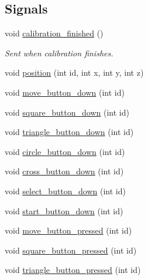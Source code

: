 \subsection*{Signals}
\begin{DoxyCompactItemize}
\item 
\hypertarget{class_p_s_move_controller_thread_a543a12ab5adceea50a94502086563dd1}{void \hyperlink{class_p_s_move_controller_thread_a543a12ab5adceea50a94502086563dd1}{calibration\-\_\-finished} ()}\label{class_p_s_move_controller_thread_a543a12ab5adceea50a94502086563dd1}

\begin{DoxyCompactList}\small\item\em Sent when calibration finishes. \end{DoxyCompactList}\item 
void \hyperlink{class_p_s_move_controller_thread_a9a13410a3629fb6ca5cd119ccccb7c61}{position} (int id, int x, int y, int z)
\item 
void \hyperlink{class_p_s_move_controller_thread_a68ad0f600e0ff8be95f2c60366f04dea}{move\-\_\-button\-\_\-down} (int id)
\item 
void \hyperlink{class_p_s_move_controller_thread_a3a2cb53014ee12bf72efed0dbd25553e}{square\-\_\-button\-\_\-down} (int id)
\item 
void \hyperlink{class_p_s_move_controller_thread_abbd16745d1102392b2fce42fb36d20bd}{triangle\-\_\-button\-\_\-down} (int id)
\item 
void \hyperlink{class_p_s_move_controller_thread_a087017d220409cae3ead0f079c3ee1ab}{circle\-\_\-button\-\_\-down} (int id)
\item 
void \hyperlink{class_p_s_move_controller_thread_ae65295b50c6bd2352eff890c2fcea268}{cross\-\_\-button\-\_\-down} (int id)
\item 
void \hyperlink{class_p_s_move_controller_thread_ad300f7edc9a77e5f7a76075334f34a59}{select\-\_\-button\-\_\-down} (int id)
\item 
void \hyperlink{class_p_s_move_controller_thread_a8c2f2095a0cfd14bdd226f2bf4521a35}{start\-\_\-button\-\_\-down} (int id)
\item 
void \hyperlink{class_p_s_move_controller_thread_a5e9c9bd13da8689e9f6553f3b4fae3ff}{move\-\_\-button\-\_\-pressed} (int id)
\item 
void \hyperlink{class_p_s_move_controller_thread_ae94b46e828fa0fe3e971f50520e3fcf2}{square\-\_\-button\-\_\-pressed} (int id)
\item 
void \hyperlink{class_p_s_move_controller_thread_a1c45f71486813b78b5bbb1306be3bc31}{triangle\-\_\-button\-\_\-pressed} (int id)

\end{DoxyCompactItemize}
